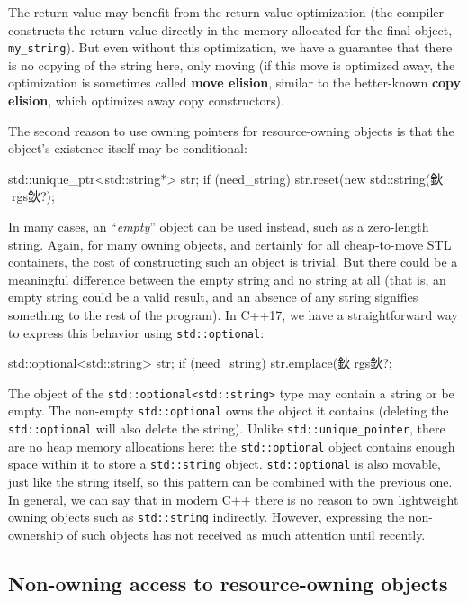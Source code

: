 The return value may benefit from the return-value optimization (the compiler constructs the return value directly in the memory allocated for the final object, \texttt{my\_string}). But even without this optimization, we have a guarantee that there is no copying of the string here, only moving (if this move is optimized away, the optimization is sometimes called \textbf{move elision}, similar to the better-known \textbf{copy elision}, which optimizes away copy constructors).

The second reason to use owning pointers for resource-owning objects is that the object's existence itself may be conditional:

\begin{code}
std::unique_ptr<std::string*> str;
if (need_string) str.reset(new std::string(鈥rgs鈥?);
\end{code}

In many cases, an ``\emph{empty}'' object can be used instead, such as a zero-length string. Again, for many owning objects, and certainly for all cheap-to-move STL containers, the cost of constructing such an object is trivial. But there could be a meaningful difference between the empty string and no string at all (that is, an empty string could be a valid result, and an absence of any string signifies something to the rest of the program). In C++17, we have a straightforward way to express this behavior using \texttt{std::optional}:

\begin{code}
std::optional<std::string> str;
if (need_string) str.emplace(鈥rgs鈥?;
\end{code}

The object of the \texttt{std::optional\textless{}std::string\textgreater{}} type may contain a string or be empty. The non-empty \texttt{std::optional} owns the object it contains (deleting the \texttt{std::optional} will also delete the string). Unlike \texttt{std::unique\_pointer}, there are no heap memory allocations here: the \texttt{std::optional} object contains enough space within it to store a \texttt{std::string} object. \texttt{std::optional} is also movable, just like the string itself, so this pattern can be combined with the previous one. In general, we can say that in modern C++ there is no reason to own lightweight owning objects such as \texttt{std::string} indirectly. However, expressing the non-ownership of such objects has not received as much attention until recently.

\subsection{Non-owning access to resource-owning objects}

